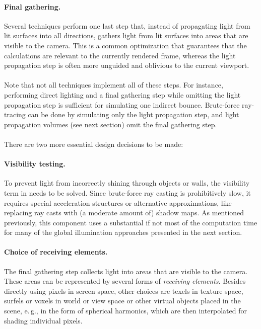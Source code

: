 \paragraph{Final gathering.}
Several techniques perform one last step that, instead of propagating light from lit surfaces into all directions, gathers light from lit surfaces into areas that are visible to the camera. This is a common optimization that guarantees that the calculations are relevant to the currently rendered frame, whereas the light propagation step is often more unguided and oblivious to the current viewport.
\\
\\
Note that not all techniques implement all of these steps. For instance, performing direct lighting and a final gathering step while omitting the light propagation step is sufficient for simulating one indirect bounce. Brute-force ray-tracing can be done by simulating only the light propagation step, and light propagation volumes (see next section) omit the final gathering step.
\\
\\
There are two more essential design decisions to be made:

\paragraph{Visibility testing.}
To prevent light from incorrectly shining through objects or walls, the visibility term in  needs to be solved. Since brute-force ray casting is prohibitively slow, it requires special acceleration structures or alternative approximations, like replacing ray casts with (a moderate amount of) shadow maps. As mentioned previously, this component uses a substantial if not most of the computation time for many of the global illumination approaches presented in the next section.

\paragraph{Choice of receiving elements.}
The final gathering step collects light into areas that are visible to the camera. These areas can be represented by several forms of \textit{receiving elements}. Besides directly using pixels in screen space, other choices are texels in texture space, surfels or voxels in world or view space or other virtual objects placed in the scene, e.\,g., in the form of spherical harmonics, which are then interpolated for shading individual pixels.

